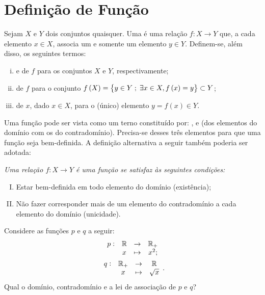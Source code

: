 \section{Definição de Função}

\begin{definition}
Sejam $X$ e $Y$ dois conjuntos quaisquer. Uma  é uma relação $f: X \to Y$ que, a cada elemento $x \in X$, associa um e somente um elemento $y \in Y$. Definem-se, além disso, os seguintes termos:
%
\begin{enumerate}[(i)]
  \item {} e  de $f$ para os conjuntos $X$ e $Y$, respectivamente;
  \item {} de $f$ para o conjunto $f\left(X\right) = \left\{ y \in Y \;;\; \exists x \in X , f \left(x\right) =
  y\right\} \subset Y$;
  \item {} de $x$, dado $x \in X$, para o (único) elemento $y = f(x) \in Y$.
\end{enumerate}
\end{definition}

\begin{remark}
Uma função pode ser vista como um terno constituído por: ,  e  (dos elementos do
domínio com os do contradomínio). Precisa-se desses três elementos para que uma função seja bem-definida. A definição alternativa a seguir também poderia ser adotada:

{\it Uma relação $f: X \to Y$ é uma \emph {função} se satisfaz às seguintes condições:
%
\begin{enumerate}[(I)]
  \item Estar bem-definida em todo elemento do domínio (existência);
  \item Não fazer corresponder mais de um elemento do contradomínio
  a cada elemento do domínio (unicidade).
\end{enumerate}}
\end{remark}

\begin{example}
\label{example:func-sq-sqrt}
Considere as funções $p$ e $q$ a seguir:
%
\begin{gather*}
\begin{array}{cccc}
p : & \mathbb{R} & \to     & \mathbb{R}_+ \\
     &  x & \mapsto & x^2;
\end{array}\\
\begin{array}{cccc}
q : & \mathbb{R}_+ & \to     & \mathbb{R} \\
     &  x & \mapsto & \sqrt x
\end{array}.
\end{gather*}
%
Qual o domínio, contradomínio e a lei de associação de $p$ e $q$?
\end{example}


